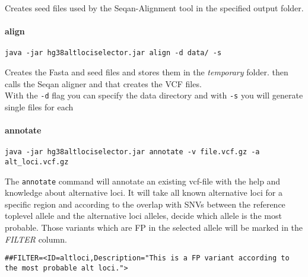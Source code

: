\documentclass[10pt,a4paper]{article}
\begin{document}
Creates seed files used by the Seqan-Alignment tool in the specified output folder.

\paragraph*{align}
\begin{verbatim}
java -jar hg38altlociselector.jar align -d data/ -s
\end{verbatim}

Creates the Fasta and seed files and stores them in the \textit{temporary} folder. then calls the Seqan aligner and that creates the VCF files.\\
With the \texttt{-d} flag you can specify the data directory and with \texttt{-s} you will generate single files for each 

\paragraph*{annotate}
\begin{verbatim}
java -jar hg38altlociselector.jar annotate -v file.vcf.gz -a alt_loci.vcf.gz
\end{verbatim}

The \texttt{annotate} command will annotate an existing vcf-file with the help and knowledge about alternative loci. It will take all known alternative loci for a specific region and according to the overlap with SNVs between the reference toplevel allele and the alternative loci alleles, decide which allele is the most probable. Those variants which are FP in the selected allele will be marked in the \textit{FILTER} column.
\begin{verbatim}
##FILTER=<ID=altloci,Description="This is a FP variant according to the most probable alt loci.">
\end{verbatim}
\end{document}
